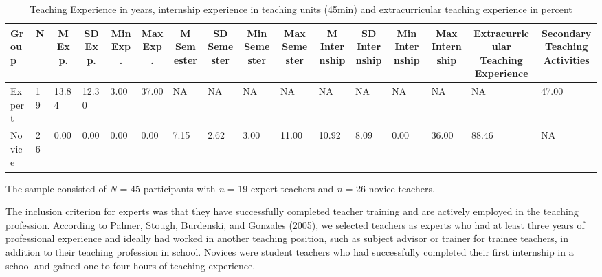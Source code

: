 \documentclass[
  man]{apa6}
\begin{document}
\begin{table}[h]

\begin{center}
\begin{threeparttable}

\caption{\label{tab:demographicstable}Teaching Experience in years, internship experience in teaching units (45min) and extracurricular teaching experience in percent}

\tiny{

\begin{tabular}{llllllllllllllll}
\toprule
Group & \multicolumn{1}{c}{N} & \multicolumn{1}{c}{M Exp.} & \multicolumn{1}{c}{SD Exp.} & \multicolumn{1}{c}{Min Exp.} & \multicolumn{1}{c}{Max Exp.} & \multicolumn{1}{c}{M Semester} & \multicolumn{1}{c}{SD Semester} & \multicolumn{1}{c}{Min Semester} & \multicolumn{1}{c}{Max Semester} & \multicolumn{1}{c}{M Internship} & \multicolumn{1}{c}{SD Internship} & \multicolumn{1}{c}{Min Internship} & \multicolumn{1}{c}{Max Internship} & \multicolumn{1}{c}{Extracurricular Teaching Experience} & \multicolumn{1}{c}{Secondary Teaching Activities}\\
\midrule
Expert & 19 & 13.84 & 12.30 & 3.00 & 37.00 & NA & NA & NA & NA & NA & NA & NA & NA & NA & 47.00\\
Novice & 26 & 0.00 & 0.00 & 0.00 & 0.00 & 7.15 & 2.62 & 3.00 & 11.00 & 10.92 & 8.09 & 0.00 & 36.00 & 88.46 & NA\\
\bottomrule
\end{tabular}

}

\end{threeparttable}
\end{center}

\end{table}

The sample consisted of \emph{N} = 45 participants with \emph{n} = 19 expert teachers and \emph{n} = 26 novice teachers.

The inclusion criterion for experts was that they have successfully completed teacher training and are actively employed in the teaching profession. According to Palmer, Stough, Burdenski, and Gonzales (2005), we selected teachers as experts who had at least three years of professional experience and ideally had worked in another teaching position, such as subject advisor or trainer for trainee teachers, in addition to their teaching profession in school. Novices were student teachers who had successfully completed their first internship in a school and gained one to four hours of teaching experience.
\end{document}
